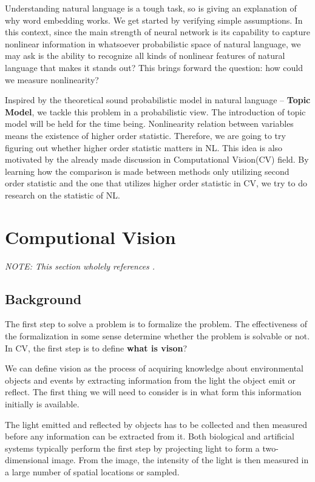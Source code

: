 \documentclass[a4paper]{book}
\begin{document}
  Understanding natural language is a tough task, so is giving an
  explanation of why word embedding works. We get started by verifying
  simple assumptions. In this context, since the main strength of neural
  network is its capability to capture nonlinear information in
  whatsoever probabilistic space of natural language, we may ask is the
  ability to recognize all kinds of nonlinear features of natural
  language that makes it stands out? This brings forward the question:
  how could we measure nonlinearity?

  Inspired by the theoretical sound probabilistic model in natural
  language -- \textbf{Topic Model}, we tackle this problem in a
  probabilistic view. The introduction of topic model will be held for
  the time being.  Nonlinearity relation between variables means the
  existence of higher order statistic. Therefore, we are going to try
  figuring out whether higher order statistic matters in NL. This idea
  is also motivated by the already made discussion in Computational
  Vision(CV) field. By learning how the comparison is made between
  methods only utilizing second order statistic and the one that
  utilizes higher order statistic in CV, we try to do research on the
  statistic of NL.

  \section{Computional Vision}
  \textit{NOTE: This section wholely references \cite{Hyvrinen09}.}

    \subsection{Background}


    The first step to solve a problem is to formalize the problem. The
    effectiveness of the formalization in some sense determine whether the
    problem is solvable or not. In CV, the first step is to define
    \textbf{what is vison}?

    We can define vision as the process of acquiring knowledge about
    environmental objects and events by extracting information from the
    light the object emit or reflect. The first thing we will need to
    consider is in what form this information initially is available.

    The light emitted and reflected by objects has to be collected and
    then measured before any information can be extracted from it. Both
    biological and artificial systems typically perform the first step by
    projecting light to form a two-dimensional image. From the image, the
    intensity of the light is then measured in a large number of spatial
    locations or sampled.
\end{document}
